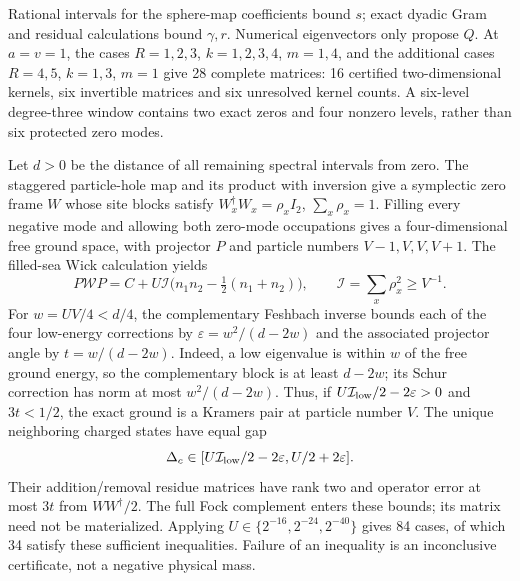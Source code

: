 Rational intervals for the sphere-map coefficients bound $s$; exact dyadic
Gram and residual calculations bound $\gamma,r$.  Numerical eigenvectors
only propose $Q$.  At $a=v=1$, the cases $R=1,2,3$, $k=1,2,3,4$, $m=1,4$,
and the additional cases $R=4,5$, $k=1,3$, $m=1$ give 28 complete matrices:
16 certified two-dimensional kernels, six invertible matrices and six
unresolved kernel counts.  A six-level degree-three window contains two
exact zeros and four nonzero levels, rather than six protected zero modes.

Let $d>0$ be the distance of all remaining spectral intervals from zero.
The staggered particle-hole map and its product with inversion give a
symplectic zero frame $W$ whose site blocks satisfy
$W_x^\dagger W_x=\rho_x I_2$, $\sum_x\rho_x=1$.
Filling every negative mode and allowing both zero-mode occupations gives
a four-dimensional free ground space, with projector $P$ and particle
numbers $V-1,V,V,V+1$.  The filled-sea Wick calculation yields
\begin{equation}
 P\mathcal WP=C+U\mathcal I
       \bigl(n_1n_2-\tfrac12(n_1+n_2)\bigr),\qquad
 \mathcal I=\sum_x\rho_x^2\geq V^{-1}.
 \label{eq:cdc-contact-compression}
\end{equation}
For $w=UV/4<d/4$, the complementary Feshbach inverse bounds each of the
four low-energy corrections by $\varepsilon=w^2/(d-2w)$ and the associated
projector angle by $t=w/(d-2w)$.  Indeed, a low eigenvalue is within $w$
of the free ground energy, so the complementary block is at least $d-2w$;
its Schur correction has norm at most $w^2/(d-2w)$.  Thus, if
$U\mathcal I_{\rm low}/2-2\varepsilon>0$ and $3t<1/2$, the exact ground
is a Kramers pair at particle number $V$.  The unique neighboring charged
states have equal gap
\begin{equation}
 \Delta_c\in[U\mathcal I_{\rm low}/2-2\varepsilon,
                  U/2+2\varepsilon].
 \label{eq:cdc-charged-gap}
\end{equation}
Their addition/removal residue matrices have rank two and operator error
at most $3t$ from $WW^\dagger/2$.  The full Fock complement enters these
bounds; its matrix need not be materialized.  Applying
$U\in\{2^{-16},2^{-24},2^{-40}\}$ gives 84 cases, of which 34 satisfy
these sufficient inequalities.  Failure of an inequality
is an inconclusive certificate, not a negative physical mass.

